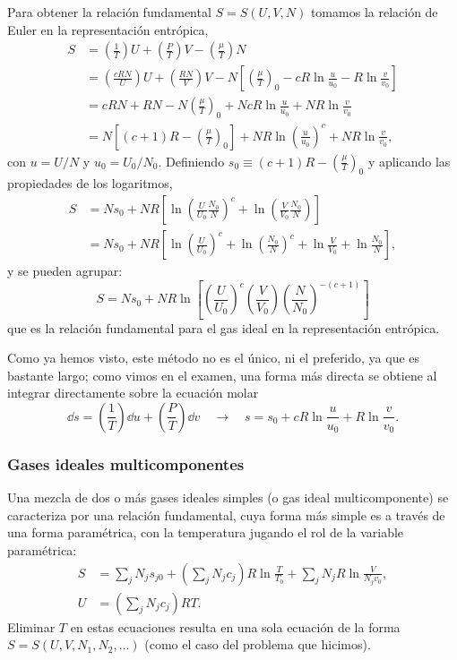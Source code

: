 Para obtener la relación fundamental $S=S(U,V,N)$ tomamos la relación de Euler en la representación
entrópica,
\begin{align*}
  S&=\left(\frac{1}{T}\right)U+\left(\frac{P}{T}\right)V-\left(\frac{\mu}{T}\right)N\\
   &=\left(\frac{cRN}{U}\right)U+\left(\frac{RN}{V}\right)V-N\left[\left(\frac{\mu}{T}\right)_0-cR\ln\frac{u}{u_0}-R\ln\frac{v}{v_0}\right]\\
   &=cRN+RN-N\left(\frac{\mu}{T}\right)_0+NcR\ln\frac{u}{u_0}+NR\ln\frac{v}{v_0}\\
   &=N\left[(c+1)R-\left(\frac{\mu}{T}\right)_0\right]+NR\ln\left(\frac{u}{u_0}\right)^{c}+NR\ln\frac{v}{v_0},
\end{align*}
con $u=U/N$ y $u_0=U_0/N_0$. Definiendo $s_0\equiv(c+1)R-\left(\frac{\mu}{T}\right)_0$ y aplicando las
propiedades de los logaritmos,
\begin{align*}
  S&=Ns_0+NR\left[\ln\left(\frac{U}{U_0}\frac{N_0}{N}\right)^{c}+\ln\left(\frac{V}{V_0}\frac{N_0}{N}\right)\right]\\
   &=Ns_0+NR\left[\ln\left(\frac{U}{U_0}\right)^{c}+\ln\left(\frac{N_0}{N}\right)^{c}+\ln\frac{V}{V_0}+\ln\frac{N_0}{N}\right],
\end{align*}
y se pueden agrupar:
\begin{equation*}
  \boxed{S=Ns_0+NR\ln\left[\left(\frac{U}{U_0}\right)^{c}\left(\frac{V}{V_0}\right)\left(\frac{N}{N_0}\right)^{-(c+1)}\right]}
\end{equation*}
que es la relación fundamental para el gas ideal en la representación entrópica.

Como ya hemos visto, este método no es el único, ni el preferido, ya que es bastante largo; como
vimos en el examen, una forma más directa se obtiene al integrar directamente sobre la ecuación
molar
\begin{equation*}
  \dd s=\left(\frac{1}{T}\right)\dd u+\left(\frac{P}{T}\right)\dd v
  \quad\longrightarrow\quad
  s=s_0+cR\ln\frac{u}{u_0}+R\ln\frac{v}{v_0}.
\end{equation*}

\subsubsection*{Gases ideales multicomponentes}

Una mezcla de dos o más gases ideales simples (o gas ideal multicomponente) se caracteriza por una
relación fundamental, cuya forma más simple es a través de una forma paramétrica, con la
temperatura jugando el rol de la variable paramétrica:
\begin{align*}
  S&=\sum_{j}N_js_{j0}+\left(\sum_{j}N_jc_j\right)R\ln\frac{T}{T_0}+\sum_{j}N_jR\ln\frac{V}{N_jv_0},\\
  U&=\left(\sum_{j}N_jc_j\right)RT.
\end{align*}
Eliminar $T$ en estas ecuaciones resulta en una sola ecuación de la forma
$S=S(U,V,N_1,N_2,\dots)$ (como el caso del problema que hicimos).

